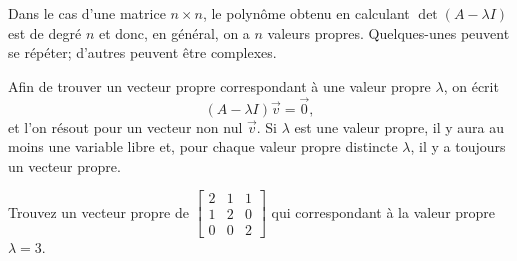 Dans le cas d’une matrice $n \times n$, le polynôme obtenu en calculant $\det(A - \lambda I)$ est de degré $n$ et donc, en général, on a $n$ valeurs propres. Quelques-unes peuvent se répéter; d’autres peuvent être complexes.

\medskip

Afin de trouver un vecteur propre correspondant à une valeur propre $\lambda$, on écrit
\begin{equation*}
(A-\lambda I) \vec{v} = \vec{0} ,
\end{equation*}
et l'on résout pour un vecteur non nul $\vec{v}$.
Si $\lambda$ est une valeur propre, il y aura au moins une variable libre et, pour chaque valeur propre distincte $\lambda$, il y a toujours un vecteur propre.

\begin{example}
Trouvez un vecteur propre de
$\left[ \begin{smallmatrix}
2 & 1 & 1 \\
1 & 2 & 0 \\
0 & 0 & 2
\end{smallmatrix} \right]$ qui correspondant à la valeur propre $\lambda = 3$.


\end{example}
